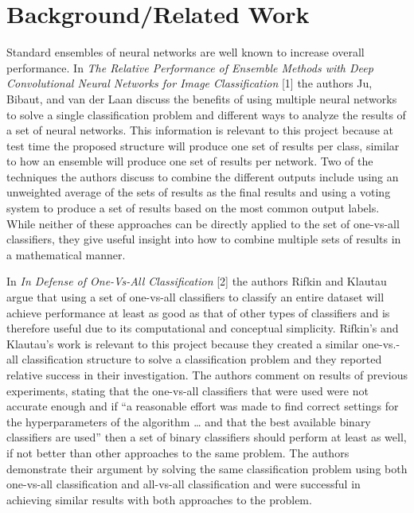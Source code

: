 \documentclass[10pt,twocolumn,letterpaper]{article}
\begin{document}
\section{Background/Related Work}
Standard ensembles of neural networks are well known to increase overall performance. In \textit{The Relative Performance of Ensemble Methods with Deep Convolutional Neural Networks for Image Classification} [1] the authors Ju, Bibaut, and van der Laan discuss the benefits of using multiple neural networks to solve a single classification problem and different ways to analyze the results of a set of neural networks. This information is relevant to this project because at test time the proposed structure will produce one set of results per class, similar to how an ensemble will produce one set of results per network. Two of the techniques the authors discuss to combine the different outputs include using an unweighted average of the sets of results as the final results and using a voting system to produce a set of results based on the most common output labels. While neither of these approaches can be directly applied to the set of one-vs-all classifiers, they give useful insight into how to combine multiple sets of results in a mathematical manner.

In \textit{In Defense of One-Vs-All Classification} [2] the authors Rifkin and Klautau argue that using a set of one-vs-all classifiers to classify an entire dataset will achieve performance at least as good as that of other types of classifiers and is therefore useful due to its computational and conceptual simplicity. Rifkin’s and Klautau’s work is relevant to this project because they created a similar one-vs.-all classification structure to solve a classification problem and they reported relative success in their investigation. The authors comment on results of previous experiments, stating that the one-vs-all classifiers that were used were not accurate enough and if “a reasonable effort was made to find correct settings for the hyperparameters of the algorithm … and that the best available binary classifiers are used” then a set of binary classifiers should perform at least as well, if not better than other approaches to the same problem. The authors demonstrate their argument by solving the same classification problem using both one-vs-all classification and all-vs-all classification and were successful in achieving similar results with both approaches to the problem.
\end{document}
